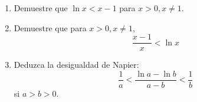 \item 
    \begin{enumerate}
        \item[(a)] Demuestre que $\ln x < x - 1$ para $x > 0, x \ne 1$.
        \item[(b)] Demuestre que para $x > 0, x \ne 1$,
        \[ \frac{x - 1}{x} < \ln x \]
        \item[(c)] Deduzca la desigualdad de Napier:
        \[ \frac{1}{a} < \frac{\ln a - \ln b}{a - b} < \frac{1}{b} \]
        si $a > b > 0$.
    \end{enumerate}
